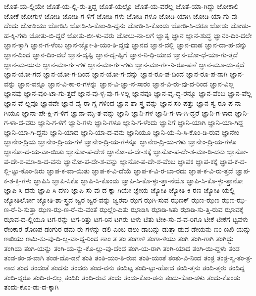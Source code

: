 {ಜೊತೆ-ಯ-ಲ್ಲಿಯೇ
ಜೊತೆ-ಯ-ಲ್ಲಿ-ರು-ತ್ತಿದ್ದ
ಜೊತೆ-ಯಲ್ಲೊ
ಜೊತೆ-ಯ-ವರೆಲ್ಲ
ಜೊತೆ-ಯಾ-ಗಿದ್ದು
ಜೋಕಾಲಿ
ಜೋಕೆ
ಜೋಗುಳ
ಜೋಡಿ
ಜೋಡಿ-ಗ-ಳಿಗೆ
ಜೋಡಿ-ಗಳು
ಜೋಡಿ-ಗಳೂ
ಜೋಡಿ-ಯಾಗಿ
ಜೋಡಿ-ಯಾ-ಗು-ವು-ದೆಂದು
ಜೋಡಿಯು
ಜೋಡಿಸಿ
ಜೋಡಿ-ಸಿ-ಕೊಂ-ಡಿ-ದ್ದನು
ಜೋಡಿ-ಸಿ-ಕೊಂಡು
ಜೋಡಿ-ಸಿ-ದರೂ
ಜೋಡು
ಜೋಡು-ಹ-ಕ್ಕಿ-ಗಳು
ಜೋತು-ಬಿ-ದ್ದರೆ
ಜೋತು-ಬೀ-ಳು-ವರು
ಜೋಲು-ನಾ-ಲಗೆ
ಜ್ಞಾತೃ
ಜ್ಞಾನ
ಜ್ಞಾನ-ಶುದ್ಧ
ಜ್ಞಾನಂ-ದಿಂ-ದಲೇ
ಜ್ಞಾನ-ಕ್ಕಾಗಿ
ಜ್ಞಾನ-ಗ-ಳೆಂಬ
ಜ್ಞಾನ-ಜ್ಯೋ-ತಿ-ಯಂ-ತಿ-ದ್ದವು
ಜ್ಞಾನದ
ಜ್ಞಾನ-ದಲ್ಲಿ
ಜ್ಞಾನ-ದಾಹ
ಜ್ಞಾನ-ದಾ-ಹ-ವನ್ನು
ಜ್ಞಾನ-ದಿಂದ
ಜ್ಞಾನ-ದಿಂ-ದಲೆ
ಜ್ಞಾನ-ದೃಷ್ಟಿ
ಜ್ಞಾನ-ದೃ-ಷ್ಟಿಗೆ
ಜ್ಞಾನ-ನಿ-ಧಿ-ಯಾದ
ಜ್ಞಾನ-ಬೋ-ಧೆ-ಯಾ-ಗು-ತ್ತದೆ
ಜ್ಞಾನ-ಮ-ಯನು
ಜ್ಞಾನ-ಮಾ-ರ್ಗ-ಗಳ
ಜ್ಞಾನ-ಮಾ-ರ್ಗ-ಗಳು
ಜ್ಞಾನ-ಮಾ-ರ್ಗ-ನಿ-ರೂ-ಪಣೆ
ಜ್ಞಾನ-ಮೂ-ಡು-ತ್ತದೆ
ಜ್ಞಾನ-ಯೋ-ಗದ
ಜ್ಞಾನ-ಯೋ-ಗ-ದಿಂದ
ಜ್ಞಾನ-ಯೋ-ಗ-ವನ್ನು
ಜ್ಞಾನ-ರೂ-ಪ-ದಿಂದ
ಜ್ಞಾನ-ರೂ-ಪ-ನಾಗಿ
ಜ್ಞಾನ-ವನ್ನು
ಜ್ಞಾನ-ವನ್ನೂ
ಜ್ಞಾನ-ವಿ-ಕಾ-ರ-ಗಳನ್ನು
ಜ್ಞಾನ-ವಿ-ಜ್ಞಾ-ನ-ಸಾರಂ
ಜ್ಞಾನ-ವಿ-ರು-ವು-ದ-ರಿಂದ
ಜ್ಞಾನ-ವಿಲ್ಲ
ಜ್ಞಾನವು
ಜ್ಞಾನ-ವುಂ-ಟಾ-ಗು-ತ್ತದೆ
ಜ್ಞಾನ-ವು-ಳ್ಳ-ವು-ಗ-ಳಲ್ಲ
ಜ್ಞಾನವೂ
ಜ್ಞಾನ-ವೃ-ದ್ಧ-ರನ್ನೂ
ಜ್ಞಾನ-ವೆಂಬ
ಜ್ಞಾನ-ವೆಲ್ಲ
ಜ್ಞಾನ-ವೆ-ಲ್ಲವೂ
ಜ್ಞಾನವೇ
ಜ್ಞಾನ-ವೈ-ರಾ-ಗ್ಯ-ಗಳಿಂದ
ಜ್ಞಾನ-ಶಾ-ಸ್ತ್ರ-ವನ್ನು
ಜ್ಞಾನ-ಸಂ-ಪತ್ತು
ಜ್ಞಾನ-ಸ್ವ-ರೂ-ಪ-ನಾ-ಗಿಯೂ
ಜ್ಞಾನಾ-ಪೇ-ಕ್ಷಿ-ಗ-ಳಿಗೆ
ಜ್ಞಾನಾ-ಮೃ-ತ-ವನ್ನು
ಜ್ಞಾನಿ
ಜ್ಞಾನಿ-ಗಳ
ಜ್ಞಾನಿ-ಗ-ಳಾ-ಗಿ-ದ್ದರೆ
ಜ್ಞಾನಿ-ಗ-ಳಾದ
ಜ್ಞಾನಿ-ಗ-ಳಾ-ದ-ವರು
ಜ್ಞಾನಿ-ಗ-ಳಿಗೆ
ಜ್ಞಾನಿ-ಗಳು
ಜ್ಞಾನಿ-ಗಳೂ
ಜ್ಞಾನಿ-ಗ-ಳೆಂದು
ಜ್ಞಾನಿಗೆ
ಜ್ಞಾನಿ-ಯಾಗಿ
ಜ್ಞಾನಿ-ಯಾ-ಗಿದ್ದ
ಜ್ಞಾನಿ-ಯಾ-ಗಿ-ದ್ದನು
ಜ್ಞಾನಿ-ಯಾದ
ಜ್ಞಾನಿ-ಯಾ-ದ-ವನು
ಜ್ಞಾನಿಯೂ
ಜ್ಞಾನಿ-ಯೆ-ನಿ-ಸಿ-ಕೊಂ-ಡಿ-ರುವ
ಜ್ಞಾನೇಂ
ಜ್ಞಾನೇಂ-ದ್ರಿಯ
ಜ್ಞಾನೇಂ-ದ್ರಿ-ಯ-ಗಳ
ಜ್ಞಾನೇಂ-ದ್ರಿ-ಯ-ಗಳನ್ನೂ
ಜ್ಞಾನೇಂ-ದ್ರಿ-ಯ-ಗಳು
ಜ್ಞಾನೇಂ-ದ್ರಿ-ಯ-ಗಳೂ
ಜ್ಞಾನೋ-ದ-ಯ-ವಾ-ಯಿತು
ಜ್ಞಾನೋ-ಪ-ದೇಶ
ಜ್ಞಾನೋ-ಪ-ದೇ-ಶಕ್ಕೆ
ಜ್ಞಾನೋ-ಪ-ದೇ-ಶ-ಮಾ-ಡಿ-ದನು
ಜ್ಞಾನೋ-ಪ-ದೇ-ಶ-ಮಾ-ಡಿ-ದ-ವನು
ಜ್ಞಾನೋ-ಪ-ದೇ-ಶ-ವನ್ನು
ಜ್ಞಾನೋ-ಪ-ದೇ-ಶ-ವೆಂಬ
ಜ್ಞಾಪಕ
ಜ್ಞಾಪ-ಕಕ್ಕೆ
ಜ್ಞಾಪ-ಕ-ದ-ಲ್ಲಿ-ಟ್ಟು-ಕೊಂ-ಡಿರು
ಜ್ಞಾಪ-ಕ-ವಾ-ಯಿತು
ಜ್ಞಾಪ-ಕ-ವಿ-ದೆಯೆ
ಜ್ಞಾಪ-ಕ-ವಿ-ರ-ಬಾ-ರದು
ಜ್ಞಾಪ-ಕ-ವಿ-ರು-ತ್ತದೆ
ಜ್ಞಾಪ-ಕ-ಶ-ಕ್ತಿ-ಗಳು
ಜ್ಞಾಪಿಸಿ
ಜ್ಞಾಪಿ-ಸಿಕೊ
ಜ್ಞಾಪಿ-ಸಿ-ಕೊಂಡು
ಜ್ಞಾಪಿ-ಸಿ-ಕೊ-ಳ್ಳು-ತ್ತಾ-ನೆಯೊ
ಜ್ಞಾಪಿ-ಸಿ-ಕೊ-ಳ್ಳು-ತ್ತಾನೋ
ಜ್ಞಾಪಿ-ಸಿ-ದನು
ಜ್ಞಾಪಿ-ಸಿ-ದಳು
ಜ್ಞಾಪಿ-ಸು-ವು-ದ-ಕ್ಕಾ-ಗಿಯೇ
ಜ್ಞೇಯ
ಜ್ಯೋತಿ
ಜ್ಯೋತಿ-ಕಿ-ರಣ
ಜ್ಯೋತಿ-ಯಲ್ಲಿ
ಜ್ಯೋತಿರ್ಲೋ
ಜ್ಯೋತಿ-ಶಾ-ಸ್ತ್ರದ
ಜ್ವರ
ಜ್ವರ-ವನ್ನು
ಜ್ವರವು
ಝಗ
ಝಗಿ-ಸುವ
ಝಣಕ್
ಝಣ-ಝಣ
ಝಣ-ಝ-ಣ-ರೆ-ನಿ-ಸುತ್ತಾ
ಝಣ-ಝ-ಣ-ರೆ-ನು-ವಂತೆ
ಝಲ್ಲೆಂ-ದಿತು
ಝಾಡಿಸಿ
ಝಾಡಿ-ಸಿತು
ಝಾಡಿ-ಸು-ತ್ತಿ-ರುವ
ಝಾವಕ್ಕೆ
ಝಾವ-ದ-ಲ್ಲಿಯೂ
ಟಗ-ರನ್ನು
ಟಗ-ರಿತ್ತು
ಟಗ-ರಿನ
ಟಗರು
ಟಳು
ಟಿತು
ಟೀಕಿ-ಸು-ವ-ವ-ರಿಗೂ
ಟೀಕೆ
ಟೀಕೆಗೆ
ಟ್ಟವಳು
ಠೇಂಕಾರ
ಠೊಣಪ
ಡಂಗುರ
ಡಮ-ರು-ಗಳನ್ನು
ಡಲಿ-ಎಂಬ
ಡಲು
ಡಾಬನ್ನು
ಡುತ್ತಾ
ಡುವ
ಡೇಯನು
ಣಂ
ಣಖಿ-ಯನ್ನು
ಣಖಿಯು
ಣಮಿ-ಸು-ವು-ದಿ-ಲ್ಲ-ವಾ-ದ್ದ-ರಿಂದ
ಣಾಂ
ತ
ತಂ
ತಂಗಾಳಿ
ತಂಗಾ-ಳಿಯು
ತಂಗಿ
ತಂಗಿ-ಗಾಗಿ
ತಂಗಿದ್ದು
ತಂಗಿಯ
ತಂಗಿ-ಯನ್ನು
ತಂಗಿ-ಯ-ನ್ನು-ಕೊ-ಲ್ಲು-ವು-ದೆಂದ
ತಂಗಿ-ಯ-ರಾಗಿ
ತಂಗಿ-ಯಾದ
ತಂಗಿ-ಯಿ-ದ್ದಳು
ತಂಡ
ತಂಡ-ತಂ-ಡ-ವಾಗಿ
ತಂಡ-ದೊ-ಡನೆ
ತಂತಿ
ತಂತಿ-ಯಂ-ತಿ-ರುವ
ತಂತಿ-ಯಂತೆ
ತಂತು-ವಿ-ನಿಂದ
ತಂತ್ರ
ತಂತ್ರ-ಸ್ವ-ತಂ-ತ್ರ-ನಾದ
ತಂದ
ತಂದಂತೆ
ತಂದನು
ತಂದರು
ತಂದ-ವನು
ತಂದಿಟ್ಟ
ತಂದಿ-ಟ್ಟು-ಹೋದ
ತಂದಿ-ತ್ತನು
ತಂದಿ-ತ್ತರು
ತಂದಿದ್ದ
ತಂದಿ-ದ್ದರೂ
ತಂದಿ-ರ-ಲಿಲ್ಲ
ತಂದಿರಿ
ತಂದಿ-ರುವ
ತಂದು
ತಂದು-ಕೊಂ-ಡನು
ತಂದು-ಕೊಂ-ಡಳು
ತಂದು-ಕೊಂಡು
ತಂದು-ಕೊಂ-ಡು-ದ-ಕ್ಕಾಗಿ
}

